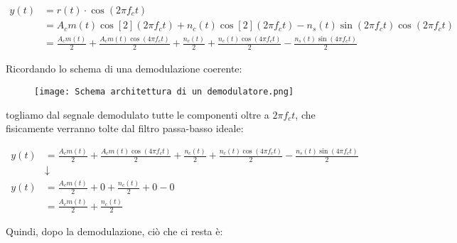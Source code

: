 {
    \Large 
    \begin{equation}
        \begin{split}
            y(t)
            &= 
            r(t) \cdot \cos(2 \pi f_c t)
            \\
            &= 
            A_c m(t) \cos[2](2 \pi f_c t)
            +
            n_c(t) \cos[2](2 \pi f_c t)
            -
            n_s(t) \sin(2 \pi f_c t) \cos(2 \pi f_c t)
            \\
            &=
            \frac{A_c m(t)}{2}
            + 
            \frac{A_c m(t) \cos(4 \pi f_c t)}{2}
            +
            \frac{n_c (t)}{2}
            +
            \frac{n_c (t) \cos(4 \pi f_c t)}{2}
            - 
            \frac{n_s (t) \sin(4 \pi f_c t)}{2}
        \end{split}
    \end{equation}
}

\newpage 

Ricordando lo schema di una demodulazione coerente: 

\begin{figure}[h]
    \centering
    \texttt{[image: Schema architettura di un demodulatore.png]}
\end{figure} 

togliamo dal segnale demodulato tutte le componenti oltre a $2 \pi f_c t$, 
che fisicamente verranno tolte dal filtro passa-basso ideale: 

{
    \Large 
    \begin{equation}
        \begin{split}
            y(t) 
            &=
            \frac{A_c m(t)}{2}
            + 
            \frac{A_c m(t) \cos(4 \pi f_c t)}{2}
            +
            \frac{n_c (t)}{2}
            +
            \frac{n_c (t) \cos(4 \pi f_c t)}{2}
            - 
            \frac{n_s (t) \sin(4 \pi f_c t)}{2}
            \\
            &\downarrow
            \\
            y(t)
            &=
            \frac{A_c m(t)}{2}
            + 
            0
            +
            \frac{n_c (t)}{2}
            +
            0
            - 
            0
            \\
            &= 
            \frac{A_c m(t)}{2}
            + 
            \frac{n_c (t)}{2}
        \end{split}
    \end{equation}
}

Quindi, dopo la demodulazione, ciò che ci resta è: 

